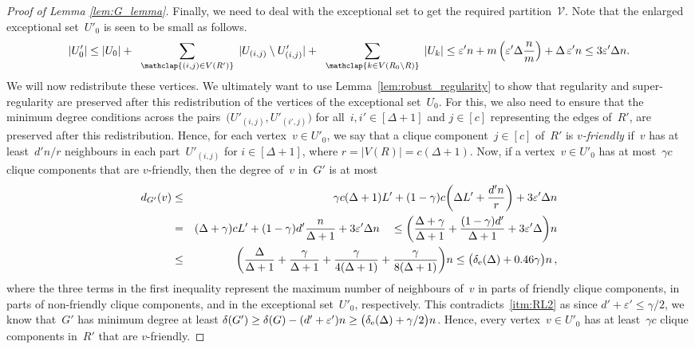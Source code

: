 \documentclass[final]{article}
\theoremstyle{definition}
\newcommand{\eps}{\varepsilon}
\newcommand{\exth}{\delta_{\rm e}(\Delta)}
\begin{document}
\begin{proof}[Proof of Lemma \ref{lem:G_lemma}]
 Finally, we need to deal with the exceptional set to get the required partition~$\mathcal{V}$. Note that the enlarged exceptional set~$U'_0$ is seen to be small as follows.
    $$|U'_0| \leq |U_0| + \;\; \sum_{\mathclap{(i,j) \in V(R')}}\; |U_{(i,j)} \setminus U'_{(i,j)}| + \;\;\sum_{\mathclap{k \in V(R_0\setminus R)}}\; |U_k| \leq \eps'n + m \left(\eps' \Delta \frac{n}{m}\right) + \Delta\, \eps' n \leq 3\eps' \Delta n.$$
\indent We will now redistribute these vertices. We ultimately want to use Lemma~\ref{lem:robust_regularity} to show that regularity and super-regularity are preserved after this redistribution of the vertices of the exceptional set~$U_0$. For this, we also need to ensure that the minimum degree conditions across the pairs~$\bigl( U'_{(i,j)}, U'_{(i',j)}\bigr)$ for all~$i, i' \in [\Delta+1]$ and $j \in [c]$ representing the edges of~$R'$, are preserved after this redistribution. Hence, for each vertex~$v \in U'_0$, we say that a clique component~$j \in [c]$ of~$R'$ is \emph{$v$-friendly} if~$v$ has at least~$d'n/r$ neighbours in each part~$U'_{(i,j)}$ for $i \in [\Delta +1]$, where $r = |V(R)| = c(\Delta+1)$. Now, if a vertex~$v \in U'_0$ has at most~$\gamma c$ clique components that are $v$-friendly, then the degree of~$v$ in~$G'$ is at most 
\begin{eqnarray*}
    d_{G'}(v) &\leq&  \gamma c (\Delta + 1) L'  + (1-\gamma)c \biggl(\Delta L' + \frac{d'n}{r} \biggr) + 3\eps'\Delta n\\
    &=& (\Delta + \gamma) cL' + (1-\gamma)d' \frac{n}{\Delta+1} + 3\eps' \Delta n \quad \leq \bigg(\frac{\Delta+\gamma}{\Delta+1} + \frac{(1-\gamma)d'}{\Delta+1} + 3\eps'\Delta\bigg)n \\
    &\leq& \bigg(\frac{\Delta}{\Delta + 1} + \frac{\gamma}{\Delta+1} + \frac{\gamma}{4(\Delta+1)} + \frac{\gamma}{8(\Delta+1)} \bigg)n \leq \big( \exth + 0.46 \gamma \big)n\, ,
\end{eqnarray*}
where the three terms in the first inequality represent the maximum number of neighbours of~$v$ in parts of friendly clique components, in parts of non-friendly clique components, and in the exceptional set~$U'_0$, respectively. This contradicts~\ref{itm:RL2} as since $d' + \eps' \leq \gamma/2$, we know that~$G'$ has minimum degree at least $\delta(G') \geq \delta(G) - (d'+\eps')n \geq \bigl( \exth + \gamma/2\bigr)n$. Hence, every vertex~$v \in U'_0$ has at least~$\gamma c$ clique components in~$R'$ that are $v$-friendly. 


\end{proof}
\end{document}
